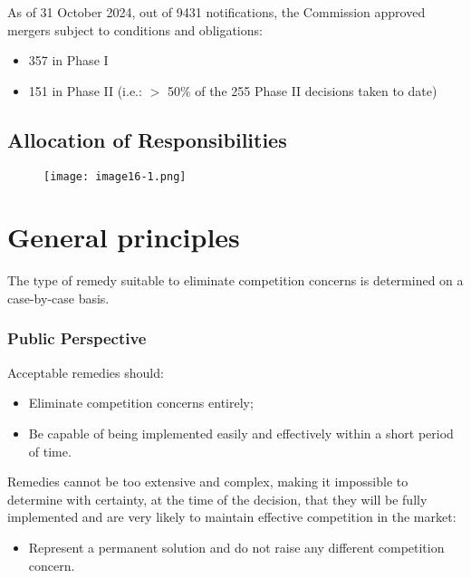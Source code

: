 As of 31 October 2024, out of 9431 notifications, the Commission approved mergers subject to conditions and obligations:
\begin{itemize}
    \item 357 in Phase I
    \item 151 in Phase II (i.e.: $>$ 50\% of the 255 Phase II decisions taken to date)
\end{itemize}

\newpage
\subsection*{Allocation of Responsibilities}

    \begin{figure}[ht]
        \centering
        \texttt{[image: image16-1.png]}
    \end{figure}

\section{General principles}

The type of remedy suitable to eliminate competition concerns is determined on a case-by-case basis.

        \subsubsection{Public Perspective}

            Acceptable remedies should:
            \begin{itemize}
                \item Eliminate competition concerns entirely;
                \item Be capable of being implemented easily and effectively
                within a short period of time.
            \end{itemize}
            
            Remedies cannot be too extensive and complex, making it impossible to determine with certainty, at the time of the decision, that they will be fully implemented and are very likely to maintain effective competition in the market:
            \begin{itemize}
                \item Represent a permanent solution and do not raise any different competition concern.
            \end{itemize}

